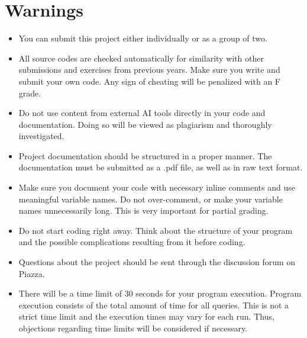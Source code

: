 \documentclass[12pt]{article}
\begin{document}
\section{Warnings}
\begin{itemize}

\item You can submit this project either individually or as a group of two. 

\item All source codes are checked automatically for similarity with other submissions and exercises from previous years. Make sure you write and submit your own code. Any sign of cheating will be penalized with an F grade.  

\item Do not use content from external AI tools directly in your code and documentation. Doing so will be viewed as plagiarism and thoroughly investigated.

\item Project documentation should be structured in a proper manner. The documentation must be submitted as a .pdf file, as well as in raw text format.

\item Make sure you document your code with necessary inline comments and use meaningful variable names. Do not over-comment, or make your variable names unnecessarily long. This is very important for partial grading. 

\item Do not start coding right away. Think about the structure of your program and the possible complications resulting from it before coding.

\item Questions about the project should be sent through the discussion forum on Piazza. 

\item There will be a time limit of 30 seconds for your program execution. Program execution consists of the total amount of time for all queries. This is not a strict time limit and the execution times may vary for each run. Thus, objections regarding time limits will be considered if necessary. 

\end{itemize}
\end{document}
